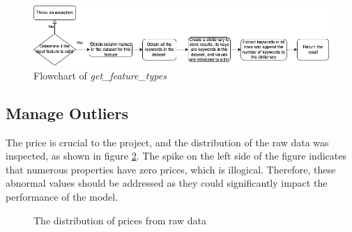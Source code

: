 \documentclass[12pt,twoside]{report}
\begin{document}
\begin{figure}[h]
	\centering
	\includegraphics[width=1\linewidth]{generalize_dataset_get_feature_types}
	\caption{Flowchart of \textit{get\_feature\_types}}
	\label{generalize_dataset_get_feature_types}
\end{figure}

\subsection{Manage Outliers}
The price is crucial to the project, and the distribution of the raw data was inspected, as shown in figure \ref{price_raw}. The spike on the left side of the figure indicates that numerous properties have zero prices, which is illogical. Therefore, these abnormal values should be addressed as they could significantly impact the performance of the model.

\begin{figure}[h]
	\centering
	\hfill
	\hfill
	\caption{The distribution of prices from raw data}
	\label{price_raw}
\end{figure}
\end{document}
